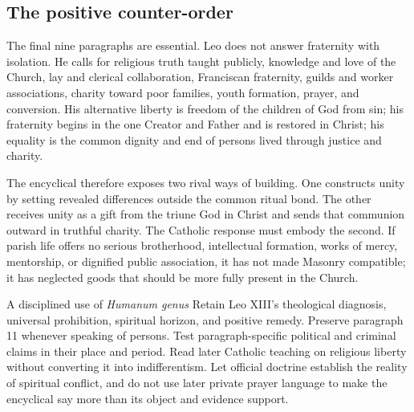 \subsection{The positive counter-order}

The final nine paragraphs are essential. Leo does not answer fraternity with isolation. He calls for religious truth taught publicly, knowledge and love of the Church, lay and clerical collaboration, Franciscan fraternity, guilds and worker associations, charity toward poor families, youth formation, prayer, and conversion. His alternative liberty is freedom of the children of God from sin; his fraternity begins in the one Creator and Father and is restored in Christ; his equality is the common dignity and end of persons lived through justice and charity.

The encyclical therefore exposes two rival ways of building. One constructs unity by setting revealed differences outside the common ritual bond. The other receives unity as a gift from the triune God in Christ and sends that communion outward in truthful charity. The Catholic response must embody the second. If parish life offers no serious brotherhood, intellectual formation, works of mercy, mentorship, or dignified public association, it has not made Masonry compatible; it has neglected goods that should be more fully present in the Church.

\begin{studybox}{A disciplined use of \emph{Humanum genus}}
Retain Leo XIII's theological diagnosis, universal prohibition, spiritual horizon, and positive remedy. Preserve paragraph 11 whenever speaking of persons. Test paragraph-specific political and criminal claims in their place and period. Read later Catholic teaching on religious liberty without converting it into indifferentism. Let official doctrine establish the reality of spiritual conflict, and do not use later private prayer language to make the encyclical say more than its object and evidence support.
\end{studybox}
